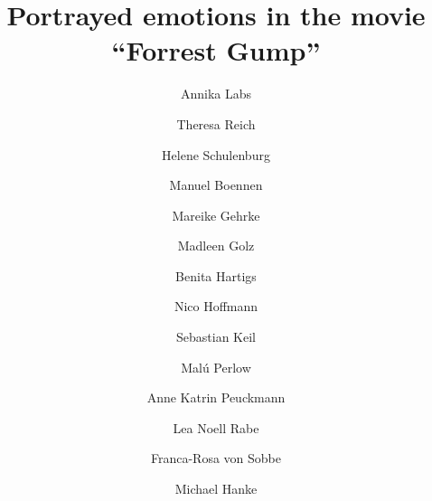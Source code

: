 \documentclass[10pt,a4paper,twocolumn]{article}
\begin{document}


\title{Portrayed emotions in the movie ``Forrest Gump''}

\author[1,*]{Annika Labs }%
\author[1,*]{Theresa Reich }%
\author[1,*]{Helene Schulenburg }%
\author[1]{Manuel Boennen }%
\author[1]{Mareike Gehrke }%
\author[1]{Madleen Golz }%
\author[1]{Benita Hartigs }%
\author[1]{Nico Hoffmann }%
\author[1]{Sebastian Keil }%
\author[1]{Mal\'{u} Perlow }%
\author[1]{Anne Katrin Peuckmann }%
\author[1]{Lea Noell Rabe }%
\author[1]{Franca-Rosa von Sobbe }%
\author[1,2]{Michael Hanke }%

\maketitle
\thispagestyle{fancy}
\end{document}
